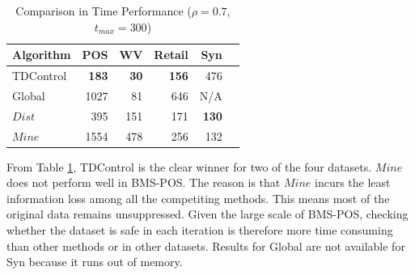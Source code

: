 \begin{table}[bh]
\caption{Comparison in Time Performance ($\rho=0.7$, $t_{max}=300$)}
\centering
\begin{tabular}{|l|r|r|r|r|r|}
  \hline
  Algorithm & POS & WV & Retail  &Syn \\  \hline \hline
  TDControl & \bf{183} & \bf{30 }& \bf{156} &   476  \\  \hline
  Global & 1027 & 81 & 646 &   N/A  \\  \hline
  $Dist$ & 395 & 151 & 171 &\bf{130}\\ \hline
  $Mine$ & 1554 & 478& 256 & 132\\ \hline
  \end{tabular}
\label{tab:timeresult}
\end{table}

From Table \ref{tab:timeresult}, TDControl is the clear winner
for two of the four datasets. $Mine$ does not perform well in BMS-POS.
The reason is that $Mine$ incurs the least information loss among all the
competiting methods. This means most of the original data remains
unsuppressed. Given the large scale of BMS-POS, checking whether the
dataset is safe in each iteration is therefore more time consuming than
other methods or in other datasets.
Results for Global are not available for Syn because
it runs out of memory.

